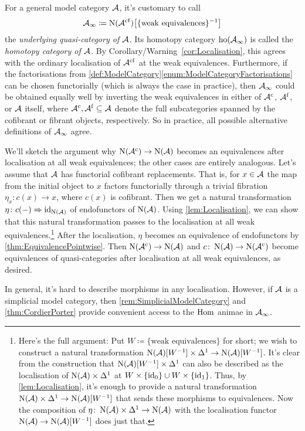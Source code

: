 \begin{rem}\label{rem:ModelCategoryUnderlyingInftyCategory}
	For a general model category $\mathcal{A}$, it's customary to call 
	\begin{equation*}
		\Aa_\infty\coloneqq \N(\Aa^\mathrm{cf})\left[\{\text{weak equivalences}\}^{-1}\right]
	\end{equation*}
	the \emph{underlying quasi-category of $\mathcal{A}$}. Its homotopy category $\operatorname{ho}(\mathcal{A}_\infty)$ is called the \emph{homotopy category of $\mathcal{A}$}. By Corollary/Warning~\cref{cor:Localisation}, this agrees with the ordinary localisation of $\mathcal{A}^\mathrm{cf}$ at the weak equivalences. Furthermore, if the factorisations from \cref{def:ModelCategory}\cref{enum:ModelCategoryFactorisations} can be chosen functorially (which is always the case in practice), then $\mathcal{A}_\infty$ could be obtained equally well by inverting the weak equivalences in either of $\mathcal{A}^\mathrm{c}$, $\mathcal{A}^\mathrm{f}$, or $\mathcal{A}$ itself, where $\mathcal{A}^\mathrm{c},\mathcal{A}^\mathrm{f}\subseteq \mathcal{A}$ denote the full subcategories spanned by the cofibrant or fibrant objects, respectively. So in practice, all possible alternative definitions of $\mathcal{A}_\infty$ agree. 
	
	We'll sketch the argument why $\operatorname{N}(\mathcal{A}^\mathrm{c})\rightarrow \operatorname{N}(\mathcal{A})$ becomes an equivalences after localisation at all weak equivalences; the other cases are entirely analogous. Let's assume that $\mathcal{A}$ has functorial cofibrant replacements. That is, for $x\in \mathcal{A}$ the map from the initial object to $x$ factors functorially through a trivial fibration $\eta_x\colon c(x)\rightarrow x$, where $c(x)$ is cofibrant. Then we get a natural transformation $\eta\colon c(-)\Rightarrow \operatorname{id}_{\operatorname{N}(\mathcal{A})}$ of endofunctors of $\operatorname{N}(\mathcal{A})$. Using \cref{lem:Localisation}, we can show that this natural transformation passes to the localisation at all weak equivalences.\footnote{Here's the full argument: Put $W\coloneqq\{\text{weak equivalences}\}$ for short; we wish to construct a natural transformation $\operatorname{N}(\mathcal{A})[W^{-1}]\times \Delta^1\rightarrow \operatorname{N}(\mathcal{A})[W^{-1}]$. It's clear from the construction that $\operatorname{N}(\mathcal{A})[W^{-1}]\times\Delta^1$ can also be described as the localisation of $\operatorname{N}(\mathcal{A})\times \Delta^1$ at $W\times\{\operatorname{id}_0\}\cup W\times\{\operatorname{id}_1\}$. Thus, by \cref{lem:Localisation}, it's enough to provide a natural transformation $\operatorname{N}(\mathcal{A})\times\Delta^1\rightarrow \operatorname{N}(\mathcal{A})[W^{-1}]$ that sends these morphisms to equivalences. Now the composition of $\eta\colon \operatorname{N}(\mathcal{A})\times\Delta^1\rightarrow \operatorname{N}(\mathcal{A})$ with the localisation functor $\operatorname{N}(\mathcal{A})\rightarrow \operatorname{N}(\mathcal{A})[W^{-1}]$ does just that.} After the localisation, $\eta$ becomes an equivalence of endofunctors by \cref{thm:EquivalencePointwise}. Then $\operatorname{N}(\mathcal{A}^\mathrm{c})\rightarrow \operatorname{N}(\mathcal{A})$ and $c\colon \operatorname{N}(\mathcal{A})\rightarrow \operatorname{N}(\mathcal{A}^\mathrm{c})$ become equivalences of quasi-categories after localisation at all weak equivalences, as desired. 
	
	
	
	
	In general, it's hard to describe morphisms in any localisation. However, if $\mathcal{A}$ is a simplicial model category, then \cref{rem:SimplicialModelCategory} and \cref{thm:CordierPorter} provide convenient access to the $\operatorname{Hom}$ animae in $\mathcal{A}_\infty$. 
\end{rem}



